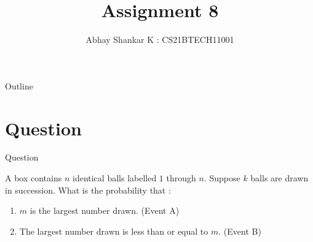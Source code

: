 \documentclass{beamer}
\DeclareMathOperator*{\pipe}{|}
\begin{document}
\newcommand{\bfr}[2]{\section{#1} \begin{frame}{#1} #2 \end{frame}}

	\title{Assignment 8}
		\author{ Abhay Shankar K : CS21BTECH11001}

	\begin{frame}
    		\titlepage 
	\end{frame}

	\begin{frame}{Outline}
    		\tableofcontents
	\end{frame}

	\providecommand{\brak}[1]{\ensuremath{\left(#1\right)}}
	\providecommand{\sbrak}[1]{\ensuremath{\left[#1\right]}}
	\providecommand{\cbrak}[1]{\ensuremath{\left\{#1\right\}}}
	\providecommand{\req}{\textbf{Required :}}
	\providecommand{\rpr}[2]{\ensuremath{P_{#1}\left(#2\right)}} %
	\providecommand{\spr}[1]{\ensuremath{P\left(#1\right)}} %
	\providecommand{\cpr}[2]{\ensuremath{\spr{#1 \pipe #2}}} %
	\newcommand*{\permcomb}[4][0mu]{{{}^{#3}\mkern#1#2_{#4}}}
	\newcommand*{\perm}[1][-3mu]{\permcomb[#1]{P}}
	\newcommand*{\comb}[1][-1mu]{\permcomb[#1]{C}}
	
	\bfr{Question}{
	
	A box contains $n$ identical balls labelled $1$ through $n$. Suppose $k$ balls are drawn in succession. What is the probability that :
	\begin{enumerate}[label = \brak{\textbf{\roman*}}]
	
		\item $m$ is the largest number drawn. (Event A)
		
		\item The largest number drawn is less than or equal to $m$. (Event B)
		
	\end{enumerate}
	
	}

		
	
	
	
	
\end{document}
